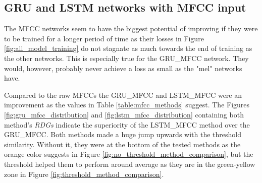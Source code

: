 \subsection{GRU and LSTM networks with MFCC input}\label{ssec:GRU_LSTM_MFCC_results}
The MFCC networks seem to have the biggest potential of improving if they were to be trained for a longer period of time as their losses in Figure \ref{fig:all_model_training} do not stagnate as much towards the end of training as the other networks. This is especially true for the GRU\_MFCC network. They would, however, probably never achieve a loss as small as the "mel" networks have. 

Compared to the raw MFCCs the GRU\_MFCC and LSTM\_MFCC were an improvement as the values in Table \ref{table:mfcc_methods} suggest. The Figures \ref{fig:gru_mfcc_distribution} and \ref{fig:lstm_mfcc_distribution} containing both method's \textit{RDGs} indicate the superiority of the LSTM\_MFCC method over the GRU\_MFCC. Both methods made a huge jump upwards with the threshold similarity. Without it, they were at the bottom of the tested methods as the orange color suggests in Figure \ref{fig:no_threshold_method_comparison}, but the threshold helped them to perform around average as they are in the green-yellow zone in Figure \ref{fig:threshold_method_comparison}.

